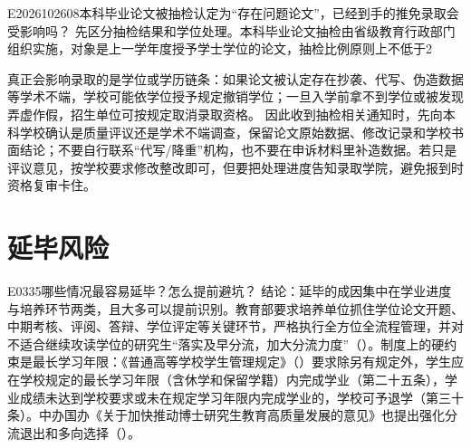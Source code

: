 \begin{qa}{E2026102608}{本科毕业论文被抽检认定为“存在问题论文”，已经到手的推免录取会受影响吗？}
先区分抽检结果和学位处理。本科毕业论文抽检由省级教育行政部门组织实施，对象是上一学年度授予学士学位的论文，抽检比例原则上不低于2%

真正会影响录取的是学位或学历链条：如果论文被认定存在抄袭、代写、伪造数据等学术不端，学校可能依学位授予规定撤销学位；一旦入学前拿不到学位或被发现弄虚作假，招生单位可按规定取消录取资格。  因此收到抽检相关通知时，先向本科学校确认是质量评议还是学术不端调查，保留论文原始数据、修改记录和学校书面结论；不要自行联系“代写/降重”机构，也不要在申诉材料里补造数据。若只是评议意见，按学校要求修改整改即可，但要把处理进度告知录取学院，避免报到时资格复审卡住。
  
\end{qa}

\section{延毕风险}
\begin{qa}{E0335}{哪些情况最容易延毕？怎么提前避坑？}
结论：延毕的成因集中在学业进度与培养环节两类，且大多可以提前识别。教育部要求培养单位抓住学位论文开题、中期考核、评阅、答辩、学位评定等关键环节，严格执行全方位全流程管理，并对不适合继续攻读学位的研究生“落实及早分流，加大分流力度”（）。制度上的硬约束是最长学习年限：《普通高等学校学生管理规定》（）要求除另有规定外，学生应在学校规定的最长学习年限（含休学和保留学籍）内完成学业（第二十五条），学业成绩未达到学校要求或未在规定学习年限内完成学业的，学校可予退学（第三十条）。中办国办《关于加快推动博士研究生教育高质量发展的意见》也提出强化分流退出和多向选择（）。
\end{qa}


